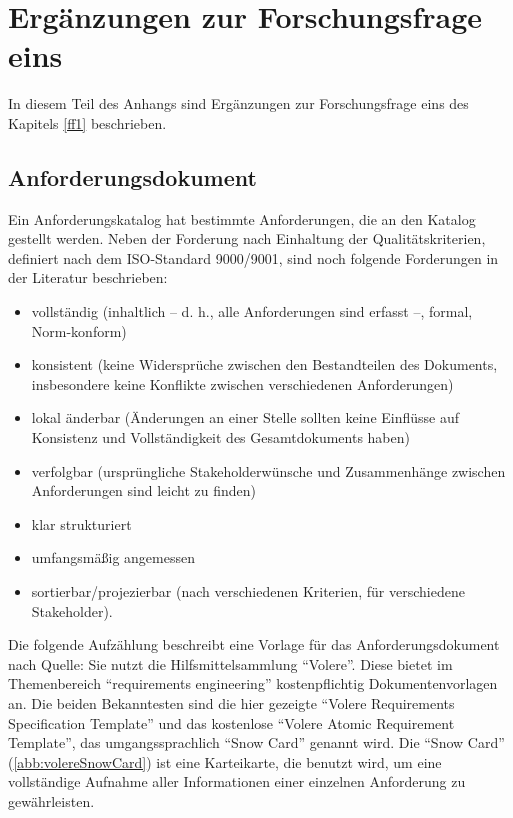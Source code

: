 \chapter{Ergänzungen zur Forschungsfrage eins} \label{appendixFF1}
In diesem Teil des Anhangs sind Ergänzungen zur Forschungsfrage eins des Kapitels \vref{ff1} beschrieben.

\section{Anforderungsdokument}\label{appendixAnforderung}

Ein Anforderungskatalog hat bestimmte Anforderungen, die an den Katalog gestellt werden. Neben der Forderung nach Einhaltung der Qualitätskriterien, definiert nach dem ISO-Standard 9000/9001, sind noch folgende Forderungen in der Literatur beschrieben: \autocite[sig.][S.34]{partsch_requirements-engineering_2010}

\begin{itemize}
	\item vollständig (inhaltlich – d. h., alle Anforderungen sind erfasst –, formal, Norm-konform)
	\item konsistent (keine Widersprüche zwischen den Bestandteilen des Dokuments,
	insbesondere keine Konflikte zwischen verschiedenen Anforderungen)
	\item lokal änderbar (Änderungen an einer Stelle sollten keine Einflüsse auf Konsistenz und Vollständigkeit des Gesamtdokuments haben)
	\item verfolgbar (ursprüngliche Stakeholderwünsche und Zusammenhänge zwischen
	Anforderungen sind leicht zu finden)
	\item klar strukturiert
	\item umfangsmäßig angemessen
	\item sortierbar/projezierbar (nach verschiedenen Kriterien, für verschiedene Stakeholder).
\end{itemize}

Die folgende Aufzählung beschreibt eine Vorlage für das Anforderungsdokument nach Quelle: Sie nutzt die Hilfsmittelsammlung \enquote{Volere}. Diese bietet im Themenbereich \enquote{requirements engineering} kostenpflichtig Dokumentenvorlagen an. Die beiden Bekanntesten sind die hier gezeigte \enquote{Volere Requirements Specification Template} und das kostenlose \enquote{Volere Atomic Requirement Template}, das umgangssprachlich \enquote{Snow Card} genannt wird. Die \enquote{Snow Card} (\vref{abb:volereSnowCard}) ist eine Karteikarte, die benutzt wird, um eine vollständige Aufnahme aller Informationen einer einzelnen Anforderung zu gewährleisten.\autocite[vgl.][]{VolereSnowCard} 

